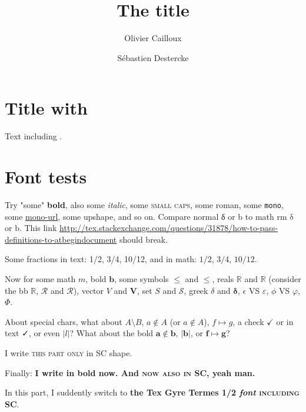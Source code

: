 \documentclass[french, english]{llncs}
\begin{document}
\title{The title}
\author{Olivier Cailloux \and Sébastien Destercke}
\makeatletter
\makeatother
\maketitle

\section{Title with \electreTRI}
Text including \electreTRI.

\section{Font tests}
Try "some" \textbf{bold}, also some \textit{italic}, some \textsc{small caps}, some \textrm{roman}, some \texttt{mono}, some \url{mono-url}, some \textup{upshape}, and so on. Compare normal δ or b to math rm $\mathrm{\delta}$ or $\mathrm{b}$.
This link \url{http://tex.stackexchange.com/questions/31878/how-to-pass-definitions-to-atbegindocument} should break.

Some fractions in text: 1/2, 3/4, 10/12, and in math: $1/2$, $3/4$, $10/12$.


Now for some math $m$, bold $\mathbf{b}$, some symbols $≤$ and $\mathbf{≤}$, reals $ℝ$ and $\mathbf{ℝ}$ (consider the bb $\mathbb{R}$, $\mathcal{R}$ and $\mathscr{R}$), vector $V$ and $\mathbf{V}$, set $S$ and $\mathcal{S}$, greek $\delta$ and $\mathbf{\delta}$, $\epsilon$ VS $\varepsilon$, $\phi$ VS $\varphi$, $\Phi$.

About special chars, what about $A \setminus B$, $a ∉ A$ (or $a \notin A$), $f \mapsto g$, a check $✓$ or in text ✓, or even $\lvert l\rvert$? What about the bold $\mathbf{a \notin b}$, $\mathbf{\lvert b\rvert}$, or $\mathbf{f \mapsto g}$?

I write \textsc{this part only} in SC shape.

Finally: \textbf{I write in bold now. And \textsc{now also in SC}, yeah man.}

{In this part, I suddently \texgyretermesfamily switch to \textbf{the Tex Gyre Termes 1/2 \textit{font} \textsc{including SC}}.}

\end{document}
